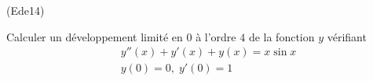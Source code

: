 \begin{tiny}(Ede14)\end{tiny} Calculer un développement limité en $0$ à l'ordre $4$ de la fonction $y$ vérifiant
\begin{align*}
 &y''(x) + y'(x) + y(x) = x\sin x\\
 &y(0)= 0, \; y'(0)=1 
\end{align*}

